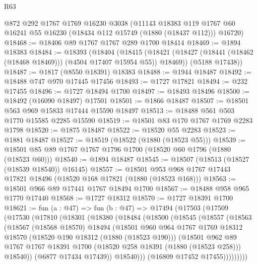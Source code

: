\begin{lexlean}{R63}
\begin{coremodule}
    @872
    @292
    @1767
    @1769
    @16230
    @3038
    (@11143
      @18383
      @119
      @1767
      @60
      @16241
      @55
      @16230
      (@18434 @112 @15749 (@1880 (@18437 @112)))
      @16720)
@18468 := @18406 @89 @1767 @1767 @289 @1700 @18414
@18469 := @1894 @18383
@18484 := @18393
    (@18404
      (@18415 (@18421 (@18427 (@18441 (@18462 (@18468 @18469))) (@4504 @17407 @15954 @55)) @18469))
      (@5188 @17438))
@18487 := @1817 (@8550 @18391) @18383
@18488 := @1944 @18487
@18492 := @18488 @747 @970 @17445 @17456
@18493 := @1727 @17821
@18494 := @232 @17455
@18496 := @1727 @18494 @1700
@18497 := @18493 @18496
@18500 := @18492 (@16090 @18497) @17501
@18501 := @1866 @18487
@18507 := @18501 @563 @969 @15833 @17444 @15590 @18497
@18513 := @18488 @561 @503 @1770 @15585 @2285 @15590
@18519 := @18501 @83 @170 @1767 @1769 @2283 @1798
@18520 := @1875 @18487
@18522 := @18520 @55 @2283
@18523 := @1881 @18487
@18527 := @18519 (@18522 (@1880 (@18523 @55)))
@18539 := @18501 @85 @89 @1767 @1767 @1796 @1700 (@18520 @60 @1796 (@1880 (@18523 @60)))
@18540 := @1894 @18487
@18545 := @18507 (@18513 (@18527 (@18539 @18540)) @16145)
@18557 := @18501 @953 @968 @1767 @17443 @17821 @18496 (@18520 @168 @17821 (@1880 (@18523 @168)))
@18563 := @18501 @966 @89 @17441 @1767 @18494 @1700
@18567 := @18488 @958 @965 @1770 @17440
@18568 := @1727 @18312
@18570 := @1727 @18391 @1700
@18621 := fun (a : @47) =>
  fun (b : @47) =>
  @17494
    (@17503
      (@17509
        (@17530
          (@17810
            (@18301
              (@18380
                (@18484
                  (@18500
                    (@18545
                      (@18557
                        (@18563
                          (@18567
                            (@18568 @18570)
                            @18494
                            (@18501
                              @960
                              @964
                              @1767
                              @1769
                              @18312
                              @18570
                              (@18520 @190 @18312 (@1880 (@18523 @190)))
                              (@18501
                                @962
                                @89
                                @1767
                                @1767
                                @18391
                                @1700
                                (@18520 @258 @18391 (@1880 (@18523 @258)))
                                @18540))
                            (@6877 @17434 @17439))
                          @18540)))
                    (@16809 @17452 @17455)))))))))

\end{coremodule}
\end{lexlean}
